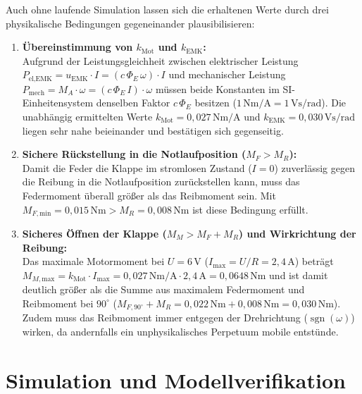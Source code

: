 \documentclass[a4paper,10pt,department=FakEI]{OTHRartcl}
\begin{document}
Auch ohne laufende Simulation lassen sich die erhaltenen Werte durch drei physikalische Bedingungen gegeneinander plausibilisieren:
\begin{enumerate}\setlength{\itemsep}{2pt}
    \item \textbf{Übereinstimmung von $k_{\text{Mot}}$ und $k_{\text{EMK}}$:}\\
    Aufgrund der Leistungsgleichheit zwischen elektrischer Leistung $P_{\text{el,EMK}} = u_{\text{EMK}} \cdot I = (c\,\Phi_E\,\omega) \cdot I$ und mechanischer Leistung $P_{\text{mech}} = M_A \cdot \omega = (c\,\Phi_E\,I) \cdot \omega$ müssen beide Konstanten im SI-Einheitensystem denselben Faktor $c\,\Phi_E$ besitzen ($1\,\text{Nm/A} = 1\,\text{Vs/rad}$). Die unabhängig ermittelten Werte $k_{\text{Mot}} = 0{,}027\,\text{Nm/A}$ und $k_{\text{EMK}} = 0{,}030\,\text{Vs/rad}$ liegen sehr nahe beieinander und bestätigen sich gegenseitig.
    \item \textbf{Sichere Rückstellung in die Notlaufposition ($M_F > M_R$):}\\
    Damit die Feder die Klappe im stromlosen Zustand ($I = 0$) zuverlässig gegen die Reibung in die Notlaufposition zurückstellen kann, muss das Federmoment überall größer als das Reibmoment sein. Mit $M_{F,\text{min}} = 0{,}015\,\text{Nm} > M_R = 0{,}008\,\text{Nm}$ ist diese Bedingung erfüllt.
    \item \textbf{Sicheres Öffnen der Klappe ($M_M > M_F + M_R$) und Wirkrichtung der Reibung:}\\
    Das maximale Motormoment bei $U = 6\,\text{V}$ ($I_{\text{max}} = U/R = 2{,}4\,\text{A}$) beträgt $M_{M,\text{max}} = k_{\text{Mot}} \cdot I_{\text{max}} = 0{,}027\,\text{Nm/A} \cdot 2{,}4\,\text{A} = 0{,}0648\,\text{Nm}$ und ist damit deutlich größer als die Summe aus maximalem Federmoment und Reibmoment bei $90^\circ$ ($M_{F,90^\circ} + M_R = 0{,}022\,\text{Nm} + 0{,}008\,\text{Nm} = 0{,}030\,\text{Nm}$). Zudem muss das Reibmoment immer entgegen der Drehrichtung ($\operatorname{sgn}(\omega)$) wirken, da andernfalls ein unphysikalisches Perpetuum mobile entstünde.
\end{enumerate}

\clearpage

\section{Simulation und Modellverifikation}
\end{document}
